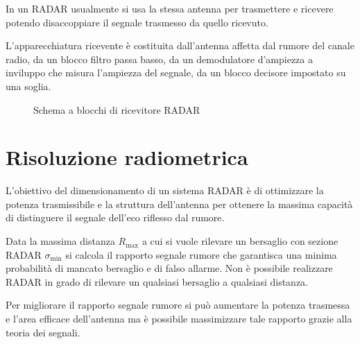 \begin{nota}In un \ac{RADAR} usualmente si usa la stessa antenna per trasmettere e ricevere potendo disaccoppiare il segnale trasmesso da quello ricevuto.\end{nota}

L'apparecchiatura ricevente è costituita dall'antenna affetta dal rumore del canale radio, da un blocco filtro passa basso, da un demodulatore d'ampiezza a inviluppo che misura l'ampiezza del segnale, da un blocco decisore impostato su una soglia.
\begin{figure}[ht]
\centering
{}
\caption{Schema a blocchi di ricevitore \ac{RADAR}}
\label{fig:ricevitore_radar}
\end{figure}

\section{Risoluzione radiometrica}
L'obiettivo del dimensionamento di un sistema \ac{RADAR} è di ottimizzare la potenza trasmissibile e la struttura dell'antenna per ottenere la massima capacità di distinguere il segnale dell'eco riflesso dal rumore.

Data la massima distanza $R_\text{max}$ a cui si vuole rilevare un bersaglio con sezione \ac{RADAR} $\sigma_\text{min}$ si calcola il rapporto segnale rumore che garantisca una minima probabilità di mancato bersaglio e di falso allarme. Non è possibile realizzare \ac{RADAR} in grado di rilevare un qualsiasi bersaglio a qualsiasi distanza.

Per migliorare il rapporto segnale rumore si può aumentare la potenza trasmessa e l'area efficace dell'antenna ma è possibile massimizzare tale rapporto grazie alla teoria dei segnali.

